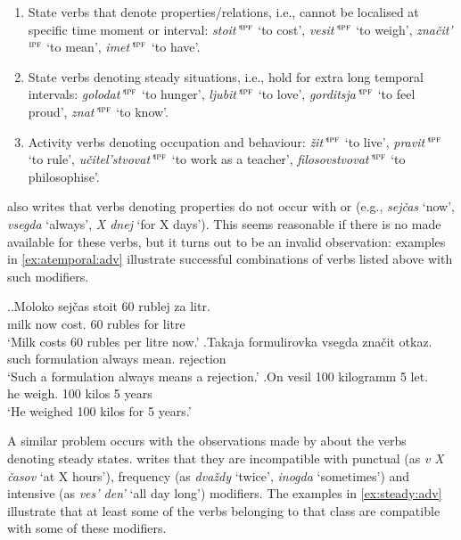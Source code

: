 \begin{enumerate}
\item State verbs that denote  properties/relations, i.e., cannot be localised at specific time moment or interval: \textit{stoit'}$^{\textsc{ipf}}$ `to cost', \textit{vesit'}$^{\textsc{ipf}}$ `to weigh', \textit{zna\v{c}it'}$^{\textsc{ipf}}$ `to mean', \textit{imet'}$^{\textsc{ipf}}$ `to have'.
\item State verbs denoting steady situations,  i.e., hold for extra long temporal intervals: \textit{golodat'}$^{\textsc{ipf}}$ `to hunger', \textit{ljubit'}$^{\textsc{ipf}}$ `to love', \textit{gorditsja'}$^{\textsc{ipf}}$ `to feel proud', \textit{znat'}$^{\textsc{ipf}}$ `to know'.
\item Activity verbs denoting occupation and behaviour: \textit{\v{z}it'}$^{\textsc{ipf}}$ `to live', \textit{pravit'}$^{\textsc{ipf}}$ `to rule', \textit{u\v{c}itel'stvovat'}$^{\textsc{ipf}}$ `to work as a teacher', \textit{filosovstvovat'}$^{\textsc{ipf}}$ `to philosophise'.
\end{enumerate}

\citet{Paducheva:96} also writes that verbs denoting  properties do not occur with  or  (e.g., \textit{sej\v{c}as} `now', \textit{vsegda} `always', \textit{X dnej} `for X days'). This seems reasonable if there is no  made available for these verbs, but it turns out to be an invalid observation: examples in \ref{ex:atemporal:adv} illustrate successful combinations of verbs listed above with such modifiers.


\ex.\label{ex:atemporal:adv}\ag.Moloko sej\v{c}as stoit 60 rublej za litr.\\
milk now cost. 60 rubles for litre\\
\trans `Milk costs 60 rubles per litre now.'
\bg.Takaja formulirovka vsegda zna\v{c}it otkaz.\\
such formulation always mean. rejection\\
\trans `Such a formulation always means a rejection.'
\bg.On vesil 100 kilogramm 5 let.\\
he weigh. 100 kilos 5 years\\
\trans `He weighed 100 kilos for 5 years.'

A similar problem occurs with the observations made by \citet{Paducheva:96} about the verbs denoting steady states. \citet{Paducheva:96} writes that they are incompatible with punctual (as \textit{v X \v{c}asov} `at X hours'), frequency (as \textit{dva\v{z}dy} `twice', \textit{inogda} `sometimes') and intensive   (as \textit{ves' den'} `all day long') modifiers. The examples in \ref{ex:steady:adv} illustrate that at least some of the verbs belonging to that class are compatible with some of these modifiers.


